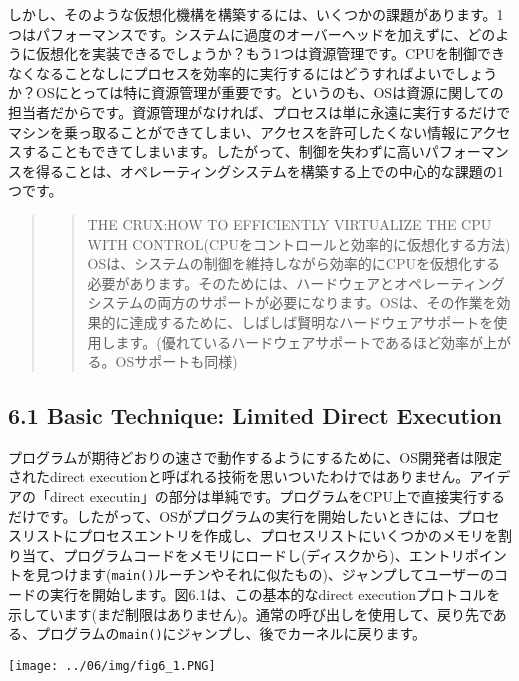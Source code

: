 しかし、そのような仮想化機構を構築するには、いくつかの課題があります。1つはパフォーマンスです。システムに過度のオーバーヘッドを加えずに、どのように仮想化を実装できるでしょうか？もう1つは資源管理です。CPUを制御できなくなることなしにプロセスを効率的に実行するにはどうすればよいでしょうか？OSにとっては特に資源管理が重要です。というのも、OSは資源に関しての担当者だからです。資源管理がなければ、プロセスは単に永遠に実行するだけでマシンを乗っ取ることができてしまい、アクセスを許可したくない情報にアクセスすることもできてしまいます。したがって、制御を失わずに高いパフォーマンスを得ることは、オペレーティングシステムを構築する上での中心的な課題の1つです。

\begin{quote}
\begin{quote}
THE CRUX:HOW TO EFFICIENTLY VIRTUALIZE THE CPU WITH
CONTROL(CPUをコントロールと効率的に仮想化する方法)\\
OSは、システムの制御を維持しながら効率的にCPUを仮想化する必要があります。そのためには、ハードウェアとオペレーティングシステムの両方のサポートが必要になります。OSは、その作業を効果的に達成するために、しばしば賢明なハードウェアサポートを使用します。(優れているハードウェアサポートであるほど効率が上がる。OSサポートも同様)
\end{quote}
\end{quote}

\hypertarget{basic-technique-limited-direct-execution}{%
\subsection*{6.1 Basic Technique: Limited Direct
Execution}\label{basic-technique-limited-direct-execution}}

プログラムが期待どおりの速さで動作するようにするために、OS開発者は限定されたdirect
executionと呼ばれる技術を思いついたわけではありません。アイデアの「direct
executin」の部分は単純です。プログラムをCPU上で直接実行するだけです。したがって、OSがプログラムの実行を開始したいときには、プロセスリストにプロセスエントリを作成し、プロセスリストにいくつかのメモリを割り当て、プログラムコードをメモリにロードし(ディスクから)、エントリポイントを見つけます(\texttt{main()}ルーチンやそれに似たもの)、ジャンプしてユーザーのコードの実行を開始します。図6.1は、この基本的なdirect
executionプロトコルを示しています(まだ制限はありません)。通常の呼び出しを使用して、戻り先である、プログラムの\texttt{main()}にジャンプし、後でカーネルに戻ります。

\texttt{[image: ../06/img/fig6\_1.PNG]}

